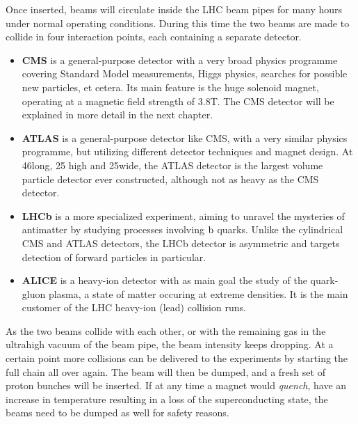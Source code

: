 Once inserted, beams will circulate inside the LHC beam pipes for many hours under
normal operating conditions. During this time the two beams are made to collide in four interaction
points, each containing a separate detector. 
\begin{itemize}
  \item \textbf{CMS} is a general-purpose detector with a very broad physics programme covering
Standard Model measurements, Higgs physics, searches for possible new particles, et cetera. Its
main feature is the huge solenoid magnet, operating at a magnetic field strength of 3.8\unit{T}. The
CMS detector will be explained in more detail in the next chapter. 
  \item \textbf{ATLAS} is a general-purpose detector like CMS, with a very similar physics
programme, but utilizing different detector techniques and magnet design. At 46\meter long, 25\meter
high and 25\meter wide, the ATLAS detector is the largest volume particle detector ever
constructed, although not as heavy as the CMS detector. 
  \item \textbf{LHCb} is a more specialized experiment, aiming to unravel the mysteries of
antimatter by studying processes involving $\mathrm{b}$ quarks. Unlike the cylindrical CMS and ATLAS
detectors, the LHCb detector is asymmetric and targets detection of forward particles in particular.
  \item \textbf{ALICE} is a heavy-ion detector with as main goal the study of the quark-gluon
plasma, a state of matter occuring at extreme densities. It is the main customer of the LHC
heavy-ion (lead) collision runs.
\end{itemize}
As the two beams collide with each other, or with the remaining gas in the ultrahigh vacuum of
the beam pipe, the beam
intensity keeps dropping. At a certain point more collisions can be delivered to the experiments by
starting the full chain all over again. The beam will then be dumped, and a fresh set of proton
bunches will be inserted. 
If at any time a magnet would \textit{quench}, have an increase in temperature resulting in a loss
of the superconducting state, the beams need to be dumped as well for safety reasons.  

